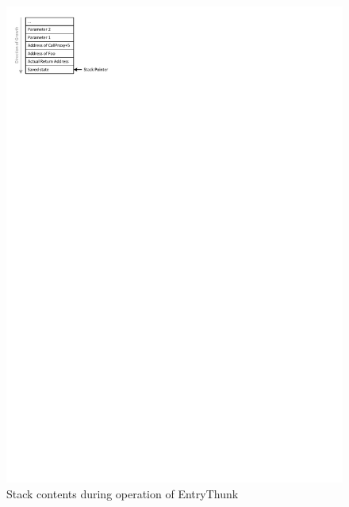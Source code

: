 \begin{figure}[htbp] 
\begin{centering} 
\includegraphics[scale=1, clip=true, viewport=0cm 25cm 7cm 30cm]{images/diagrams/EntryExitTracing_StackAtThunk.pdf} 
\caption{Stack contents during operation of EntryThunk} 
\label{EntryExitTracing_StackAtThunk} 
\end{centering} 
\end{figure}

